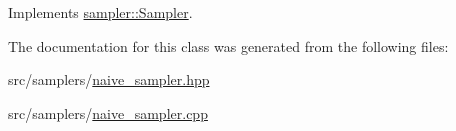 Implements \mbox{\hyperlink{classsampler_1_1Sampler_ad326337d2bac30ca6f95d01833d6e932}{sampler\+::\+Sampler}}.



The documentation for this class was generated from the following files\+:\begin{DoxyCompactItemize}
\item 
src/samplers/\mbox{\hyperlink{naive__sampler_8hpp}{naive\+\_\+sampler.\+hpp}}\item 
src/samplers/\mbox{\hyperlink{naive__sampler_8cpp}{naive\+\_\+sampler.\+cpp}}\end{DoxyCompactItemize}
